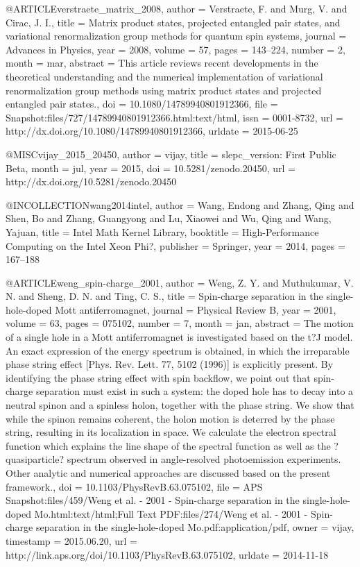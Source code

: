 @ARTICLE{verstraete_matrix_2008,
  author = {Verstraete, F. and Murg, V. and Cirac, J. I.},
  title = {Matrix product states, projected entangled pair states, and variational
	renormalization group methods for quantum spin systems},
  journal = {Advances in Physics},
  year = {2008},
  volume = {57},
  pages = {143--224},
  number = {2},
  month = mar,
  abstract = {This article reviews recent developments in the theoretical understanding
	and the numerical implementation of variational renormalization group
	methods using matrix product states and projected entangled pair
	states.},
  doi = {10.1080/14789940801912366},
  file = {Snapshot:files/727/14789940801912366.html:text/html},
  issn = {0001-8732},
  url = {http://dx.doi.org/10.1080/14789940801912366},
  urldate = {2015-06-25}
}

@MISC{vijay_2015_20450,
  author = {vijay},
  title = {slepc_version: First Public Beta},
  month = jul,
  year = {2015},
  doi = {10.5281/zenodo.20450},
  url = {http://dx.doi.org/10.5281/zenodo.20450}
}

@INCOLLECTION{wang2014intel,
  author = {Wang, Endong and Zhang, Qing and Shen, Bo and Zhang, Guangyong and
	Lu, Xiaowei and Wu, Qing and Wang, Yajuan},
  title = {Intel Math Kernel Library},
  booktitle = {High-Performance Computing on the Intel{\textregistered} Xeon Phi?},
  publisher = {Springer},
  year = {2014},
  pages = {167--188}
}

@ARTICLE{weng_spin-charge_2001,
  author = {Weng, Z. Y. and Muthukumar, V. N. and Sheng, D. N. and Ting, C. S.},
  title = {Spin-charge separation in the single-hole-doped {Mott} antiferromagnet},
  journal = {Physical Review B},
  year = {2001},
  volume = {63},
  pages = {075102},
  number = {7},
  month = jan,
  abstract = {The motion of a single hole in a Mott antiferromagnet is investigated
	based on the t?J model. An exact expression of the energy spectrum
	is obtained, in which the irreparable phase string effect [Phys.
	Rev. Lett. 77, 5102 (1996)] is explicitly present. By identifying
	the phase string effect with spin backflow, we point out that spin-charge
	separation must exist in such a system: the doped hole has to decay
	into a neutral spinon and a spinless holon, together with the phase
	string. We show that while the spinon remains coherent, the holon
	motion is deterred by the phase string, resulting in its localization
	in space. We calculate the electron spectral function which explains
	the line shape of the spectral function as well as the ?quasiparticle?
	spectrum observed in angle-resolved photoemission experiments. Other
	analytic and numerical approaches are discussed based on the present
	framework.},
  doi = {10.1103/PhysRevB.63.075102},
  file = {APS Snapshot:files/459/Weng et al. - 2001 - Spin-charge separation in the single-hole-doped Mo.html:text/html;Full Text PDF:files/274/Weng et al. - 2001 - Spin-charge separation in the single-hole-doped Mo.pdf:application/pdf},
  owner = {vijay},
  timestamp = {2015.06.20},
  url = {http://link.aps.org/doi/10.1103/PhysRevB.63.075102},
  urldate = {2014-11-18}
}

